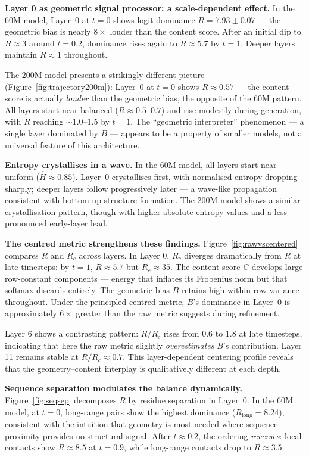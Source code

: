 \documentclass{article}
\begin{document}
\textbf{Layer 0 as geometric signal processor: a scale-dependent effect.}
In the 60M model, Layer~0 at $t{=}0$ shows logit dominance $R = 7.93 \pm 0.07$ --- the geometric bias is nearly $8\times$ louder than the content score.
After an initial dip to $R \approx 3$ around $t{=}0.2$, dominance rises again to $R \approx 5.7$ by $t{=}1$.
Deeper layers maintain $R \approx 1$ throughout.

The 200M model presents a strikingly different picture (Figure~\ref{fig:trajectory200m}): Layer~0 at $t{=}0$ shows $R \approx 0.57$ --- the content score is actually \emph{louder} than the geometric bias, the opposite of the 60M pattern.
All layers start near-balanced ($R \approx 0.5$--$0.7$) and rise modestly during generation, with $R$ reaching $\sim$1.0--1.5 by $t{=}1$.
The ``geometric interpreter'' phenomenon --- a single layer dominated by $B$ --- appears to be a property of smaller models, not a universal feature of this architecture.

\textbf{Entropy crystallises in a wave.}
In the 60M model, all layers start near-uniform ($\hat{H} \approx 0.85$).
Layer~0 crystallises first, with normalised entropy dropping sharply; deeper layers follow progressively later --- a wave-like propagation consistent with bottom-up structure formation.
The 200M model shows a similar crystallisation pattern, though with higher absolute entropy values and a less pronounced early-layer lead.

\textbf{The centred metric strengthens these findings.}
Figure~\ref{fig:rawvscentered} compares $R$ and $R_c$ across layers.
In Layer 0, $R_c$ diverges dramatically from $R$ at late timesteps: by $t{=}1$, $R \approx 5.7$ but $R_c \approx 35$.
The content score $C$ develops large row-constant components --- energy that inflates its Frobenius norm but that softmax discards entirely.
The geometric bias $B$ retains high within-row variance throughout.
Under the principled centred metric, $B$'s dominance in Layer~0 is approximately $6\times$ greater than the raw metric suggests during refinement.

Layer 6 shows a contrasting pattern: $R/R_c$ rises from 0.6 to 1.8 at late timesteps, indicating that here the raw metric slightly \emph{overestimates} $B$'s contribution.
Layer 11 remains stable at $R/R_c \approx 0.7$.
This layer-dependent centering profile reveals that the geometry--content interplay is qualitatively different at each depth.

\textbf{Sequence separation modulates the balance dynamically.}
Figure~\ref{fig:seqsep} decomposes $R$ by residue separation in Layer~0.
In the 60M model, at $t{=}0$, long-range pairs show the highest dominance ($R_\text{long} = 8.24$), consistent with the intuition that geometry is most needed where sequence proximity provides no structural signal.
After $t \approx 0.2$, the ordering \emph{reverses}: local contacts show $R \approx 8.5$ at $t{=}0.9$, while long-range contacts drop to $R \approx 3.5$.
\end{document}
